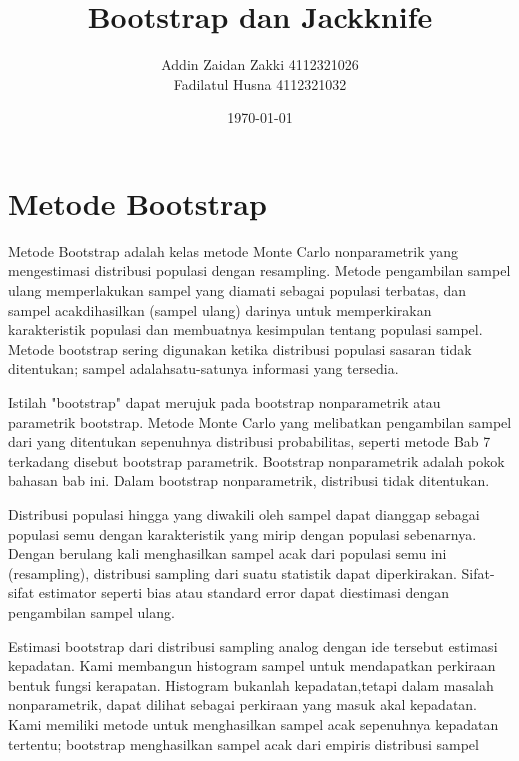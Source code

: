 \documentclass[a4paper,12pt]{article}
\theoremstyle{definition}
\begin{document}
    \title{Bootstrap dan Jackknife}
    \author{Addin Zaidan Zakki 4112321026\\
    Fadilatul Husna 4112321032\\
    }
\date{\today}
\begin{titlepage}
    \maketitle
\end{titlepage}

\section{Metode Bootstrap}
Metode Bootstrap adalah kelas metode Monte Carlo nonparametrik yang mengestimasi distribusi populasi dengan resampling. Metode pengambilan sampel ulang memperlakukan sampel yang diamati sebagai populasi terbatas, dan sampel acakdihasilkan (sampel ulang) darinya untuk memperkirakan karakteristik populasi dan membuatnya kesimpulan tentang populasi sampel. Metode bootstrap sering digunakan ketika distribusi populasi sasaran tidak ditentukan; sampel adalahsatu-satunya informasi yang tersedia.

Istilah "bootstrap" dapat merujuk pada bootstrap nonparametrik atau parametrik bootstrap. Metode Monte Carlo yang melibatkan pengambilan sampel dari yang ditentukan sepenuhnya distribusi probabilitas, seperti metode Bab 7 terkadang disebut bootstrap parametrik. Bootstrap nonparametrik adalah pokok bahasan bab ini.
Dalam bootstrap nonparametrik, distribusi tidak ditentukan.

Distribusi populasi hingga yang diwakili oleh sampel dapat
dianggap sebagai populasi semu dengan karakteristik yang mirip dengan populasi sebenarnya. Dengan berulang kali menghasilkan sampel acak dari populasi semu ini (resampling), distribusi sampling dari suatu statistik dapat diperkirakan. Sifat-sifat estimator seperti bias atau standard error dapat diestimasi dengan pengambilan sampel ulang.

Estimasi bootstrap dari distribusi sampling analog dengan ide tersebut estimasi kepadatan. Kami membangun histogram sampel untuk mendapatkan perkiraan bentuk fungsi kerapatan. Histogram bukanlah kepadatan,tetapi dalam masalah nonparametrik, dapat dilihat sebagai perkiraan yang masuk akal
kepadatan. Kami memiliki metode untuk menghasilkan sampel acak sepenuhnya kepadatan tertentu; bootstrap menghasilkan sampel acak dari empiris distribusi sampel
\end{document}
